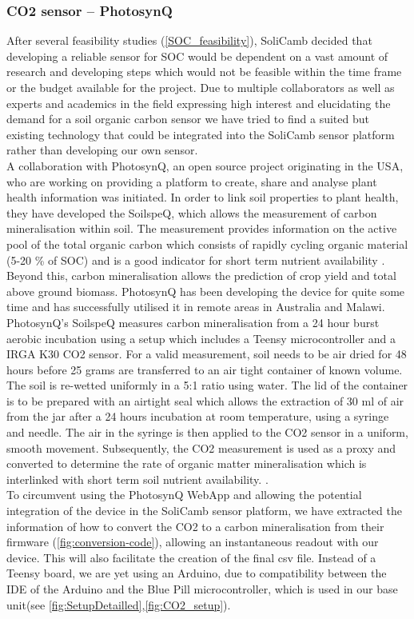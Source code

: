\subsubsection{\gls{CO2} sensor -- PhotosynQ}\label{CO2sensor}
After several feasibility studies (\cref{SOC_feasibility}), SoliCamb decided that developing a reliable sensor for \gls{SOC} would be dependent on a vast amount of research and developing steps which would not be feasible within the time frame or the budget available for the project. Due to multiple collaborators as well as experts and academics in the field expressing high interest and elucidating the demand for a soil organic carbon sensor we have tried to find a suited but existing technology that could be integrated into the SoliCamb sensor platform rather than developing our own sensor. \\
A collaboration with PhotosynQ, an open source project originating in the USA, who are working on providing a platform to create, share and analyse plant health information was initiated. In order to link soil properties to plant health, they have developed the SoilspeQ, which allows the measurement of carbon mineralisation within soil. The measurement provides information on the active pool of the total organic carbon which consists of rapidly cycling organic material (5-20 \% of \gls{SOC}) \cite{Gregorich,Wander04} and is a good indicator for short term nutrient availability \cite{Haynes, Lewis, Wander04}. Beyond this, carbon mineralisation allows the prediction of crop yield and total above ground biomass. PhotosynQ has been developing the device for quite some time and has successfully utilised it in remote areas in Australia and Malawi.\\
PhotosynQ’s SoilspeQ measures carbon mineralisation from a 24 hour burst aerobic incubation using a setup which includes a Teensy microcontroller and a IRGA K30 \gls{CO2} sensor. 
For a valid measurement, soil needs to be air dried for 48 hours before 25 grams are transferred to an air tight container of known volume. The soil is re-wetted uniformly in a 5:1 ratio using water. The lid of the container is to be prepared with an airtight seal which allows the extraction of 30 ml of air from the jar after a 24 hours incubation at room temperature, using a syringe and needle. The air in the syringe is then applied to the \gls{CO2} sensor in a uniform, smooth movement. Subsequently, the \gls{CO2}  measurement is used as a proxy and converted to determine the rate of organic matter mineralisation which is interlinked with short term soil nutrient availability. \cite{HurissoCulman}.\\
To circumvent using the PhotosynQ WebApp and allowing the potential integration of the device in the SoliCamb sensor platform, we have extracted the information of how to convert the \gls{CO2} to a carbon mineralisation from their firmware (\cref{fig:conversion-code}), allowing an instantaneous readout with our device. This will also facilitate the creation of the final \gls{csv} file. Instead of a Teensy board, we are yet using an Arduino, due to compatibility between the IDE of the Arduino and the Blue Pill microcontroller, which is used in our base unit(see \cref{fig:SetupDetailled},\cref{fig:CO2_setup}). 

